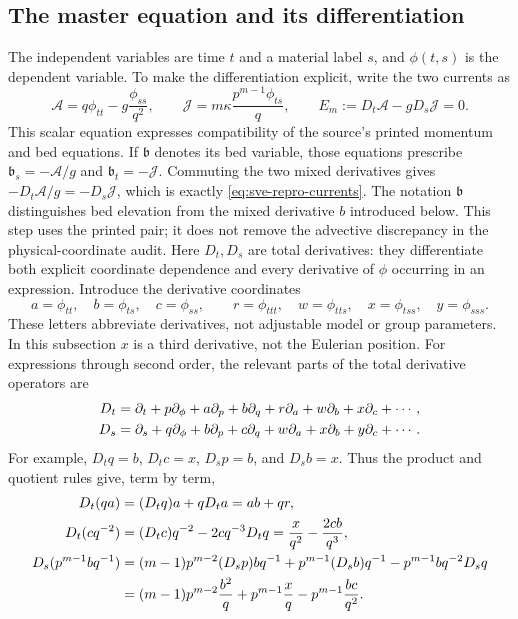 \documentclass[11pt]{article}
\theoremstyle{definition}
\begin{document}
\subsection{The master equation and its differentiation}
The independent variables are time $t$ and a material label $s$, and
$\phi(t,s)$ is the dependent variable. To make the differentiation explicit,
write the two currents as
\begin{equation}
 \mathcal A=q\phi_{tt}-g\frac{\phi_{ss}}{q^2},\qquad
 \mathcal J=m\kappa\frac{p^{m-1}\phi_{ts}}{q},\qquad
 E_m:=D_t\mathcal A-gD_s\mathcal J=0.
 \label{eq:sve-repro-currents}
\end{equation}
This scalar equation expresses compatibility of the source's printed
momentum and bed equations. If $\mathfrak b$ denotes its bed variable,
those equations prescribe $\mathfrak b_s=-\mathcal A/g$ and
$\mathfrak b_t=-\mathcal J$. Commuting the two mixed derivatives gives
$-D_t\mathcal A/g=-D_s\mathcal J$, which is exactly
\eqref{eq:sve-repro-currents}. The notation $\mathfrak b$ distinguishes
bed elevation from the mixed derivative $b$ introduced below. This step
uses the printed pair; it does not remove the advective discrepancy in
the physical-coordinate audit.
Here $D_t,D_s$ are total derivatives: they differentiate both explicit
coordinate dependence and every derivative of $\phi$ occurring in an
expression. Introduce the derivative coordinates
\[
 a=\phi_{tt},\quad b=\phi_{ts},\quad c=\phi_{ss},\qquad
 r=\phi_{ttt},\quad w=\phi_{tts},\quad x=\phi_{tss},\quad y=\phi_{sss}.
\]
These letters abbreviate derivatives, not adjustable model or group
parameters. In this subsection $x$ is a third derivative, not the Eulerian position.
For expressions through second order, the relevant parts of the total
derivative operators are
\begin{align}
 D_t&=\partial_t+p\partial_\phi+a\partial_p+b\partial_q
                 +r\partial_a+w\partial_b+x\partial_c+\cdots,\notag\\
 D_s&=\partial_s+q\partial_\phi+b\partial_p+c\partial_q
                 +w\partial_a+x\partial_b+y\partial_c+\cdots.
 \label{eq:sve-total-operators}
\end{align}
For example, $D_tq=b$, $D_tc=x$, $D_sp=b$, and $D_sb=x$.
Thus the product and quotient rules give, term by term,
\begin{align}
 D_t(qa)&=(D_tq)a+qD_ta=ab+qr,\notag\\
 D_t(cq^{-2})&=(D_tc)q^{-2}-2cq^{-3}D_tq
                =\frac{x}{q^2}-\frac{2cb}{q^3},\notag\\
 D_s(p^{m-1}bq^{-1})
   &=(m-1)p^{m-2}(D_sp)bq^{-1}
       +p^{m-1}(D_sb)q^{-1}-p^{m-1}bq^{-2}D_sq\notag\\
   &=(m-1)p^{m-2}\frac{b^2}{q}
       +p^{m-1}\frac{x}{q}-p^{m-1}\frac{bc}{q^2}.
 \label{eq:sve-current-differentiation}
\end{align}
\end{document}
